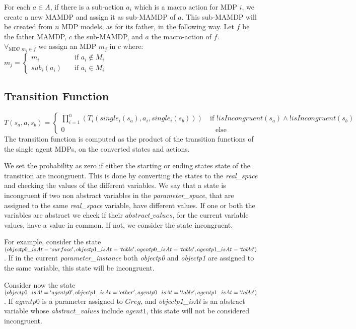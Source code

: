 For each $a \in A$, if there is a sub-action $a_i$ which is a macro action for MDP $i$, we create a new MAMDP and assign it as sub-MAMDP of $a$. This sub-MAMDP will be created from $n$ MDP models, as for its father, in the following way. Let $f$ be the father MAMDP, $c$ the sub-MAMDP, and $a$ the macro-action of $f$. \\
 $ \forall_{\text{MDP}\> m_i \in f}$ we assign an MDP $m_j$ in $c$ where:\\
$m_j= \begin{cases}
	m_i & \quad \text{if } a_i \not\in M_i \\
	sub_i(a_i) & \quad \text{if } a_i \in M_i 
\end{cases}$ \\

\subsection{Transition Function}
$T(s_a,a,s_b)=
\begin{cases}
\prod_{i=1}^{n}(T_i(single_i(s_a),a_i,single_i(s_b))) & \> \text{if } !isIncongruent(s_a) \land  !isIncongruent(s_b)  \\
0   & \quad \text{else}
	\end{cases}$ \\

The transition function is computed as the product of the transition functions of the single agent MDPs, on the converted states and actions.

We set the probability as zero if either the starting or ending states state of the transition are incongruent. This is done by converting the states to the \textit{real\_space} and checking the values of the different variables. We say that a state is incongruent if two non abstract variables in the \textit{parameter\_space}, that are assigned to the same \textit{real\_space} variable, have different values. If one or both the variables are abstract we check if their $abstract\_values$, for the current variable values, have a value in common. If not, we consider the state incongruent.

For example, consider the state $(objectp0\_isAt=`surface', objectp1\_isAt=`table', agentp0\_isAt=`table', agentp1\_isAt=`table')$. If in the current \textit{parameter\_instance} both \textit{objectp0} and \textit{objectp1} are assigned to the same variable, this state will be incongruent.

Consider now the state $(objectp0\_isAt=`agentp0', objectp1\_isAt=`other', agentp0\_isAt=`table', \\ agentp1\_isAt=`table')$. If $agentp0$ is a parameter assigned to $Greg$, and \textit{objectp1\_isAt} is an abstract variable whose \textit{abstract\_values} include $agent1$, this state will not be considered incongruent.  


